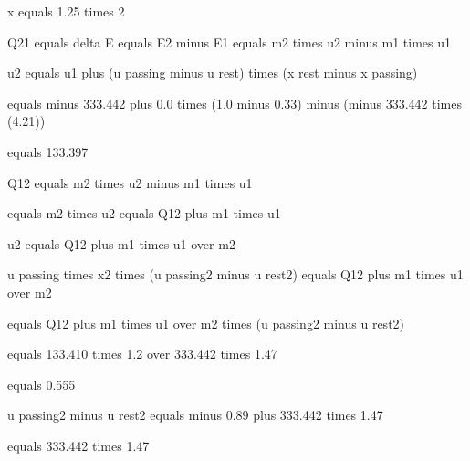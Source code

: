 x equals 1.25 times 2

Q21 equals delta E
     equals E2 minus E1
     equals m2 times u2 minus m1 times u1

u2 equals u1 plus (u passing minus u rest) times (x rest minus x passing)

equals minus 333.442 plus 0.0 times (1.0 minus 0.33) minus (minus 333.442 times (4.21))

equals 133.397

Q12 equals m2 times u2 minus m1 times u1

equals m2 times u2 equals Q12 plus m1 times u1

u2 equals Q12 plus m1 times u1 over m2

u passing times x2 times (u passing2 minus u rest2) equals Q12 plus m1 times u1 over m2

equals Q12 plus m1 times u1 over m2 times (u passing2 minus u rest2)

equals 133.410 times 1.2 over 333.442 times 1.47

equals 0.555

u passing2 minus u rest2 equals minus 0.89 plus 333.442 times 1.47

equals 333.442 times 1.47